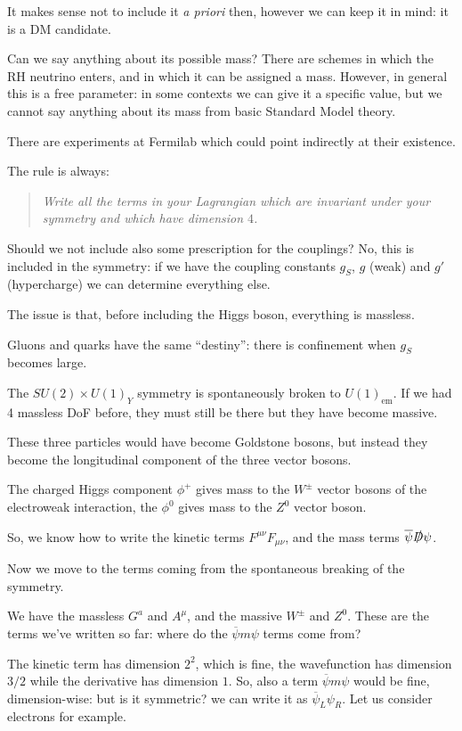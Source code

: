 \documentclass[main.tex]{subfiles}
\begin{document}
It makes sense not to include it \emph{a priori} then, however we can keep it in mind: it is a DM candidate.

Can we say anything about its possible mass? There are schemes in which the RH neutrino enters, and in which it can be assigned a mass. However, in general this is a free parameter: in some contexts we can give it a specific value, but we cannot say anything about its mass from basic Standard Model theory.

There are experiments at Fermilab which could point indirectly at their existence.

The rule is always: 
\begin{quote}
    \emph{Write all the terms in your Lagrangian which are invariant under your symmetry and which have dimension \( 4\).}
\end{quote}

Should we not include also some prescription for the couplings? 
No, this is included in the symmetry: if we have the coupling constants \(g_S\), \(g\) (weak) and \(g'\) (hypercharge) we can determine everything else.

The issue is that, before including the Higgs boson, everything is massless.

Gluons and quarks have the same ``destiny'': there is confinement when \(g_S\) becomes large.

The \(SU(2) \times U(1)_{Y}\) symmetry is spontaneously broken to \(U(1)_{\text{em}}\). If we had 4 massless DoF before, they must still be there but they have become massive.

These three particles would have become Goldstone bosons, but instead they become the longitudinal component of the three vector bosons.

The charged Higgs component \(\phi^{+}\) gives mass to the \(W^{\pm}\) vector bosons of the electroweak interaction, the \(\phi^{0}\) gives mass to the \(Z^{0}\) vector boson. 

So, we know how to write the kinetic terms \(F^{\mu \nu } F_{\mu \nu }\), and the mass terms \(\overline{\psi} \slashed{D} \psi \). 

Now we move to the terms coming from the spontaneous breaking of the symmetry. 

We have the massless \(G^{a}\) and \(A^{\mu }\), and the massive \(W^{\pm}\) and \(Z^{0}\). These are the terms we've written so far: where do the \(\overline{\psi} m  \psi \) terms come from?

The kinetic term has dimension \(2^2\), which is fine, the wavefunction has dimension \(3/2\) while the derivative has dimension \(1\).
So, also a term \(\overline{\psi} m \psi \) would be fine, dimension-wise: but is it symmetric? we can write it as \(\overline{\psi}_{L} \psi_{R}\). Let us consider electrons for example.
\end{document}

